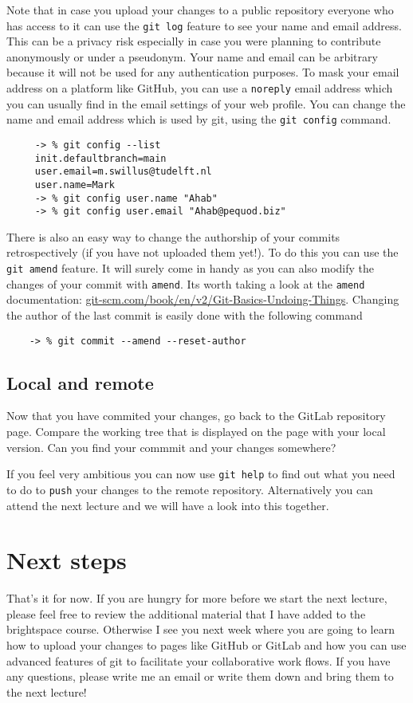 \documentclass[12pt]{article}
\begin{document}
Note that in case you upload your changes to a public repository
everyone who has access to it can use the \texttt{git log} feature to see your name
and email address. This can be a privacy risk especially in case you were
planning to contribute anonymously or under a pseudonym.
Your name and email can be arbitrary because it will not be used
for any authentication purposes.
To mask your email address on a platform like GitHub,
you can use a \texttt{noreply} email address which you can usually find in the email settings
of your web profile.
You can change the name and email address which is used by git,
using the \texttt{git config} command.

    \begin{verbatim}
     -> % git config --list
     init.defaultbranch=main
     user.email=m.swillus@tudelft.nl
     user.name=Mark
     -> % git config user.name "Ahab"
     -> % git config user.email "Ahab@pequod.biz"
    \end{verbatim}

There is also an easy way to change the authorship of your commits
retrospectively (if you have not uploaded them yet!).
To do this you can use the \texttt{git amend} feature.
It will surely come in handy as you can also modify the changes of your commit
with \texttt{amend}.
Its worth taking a look at the \texttt{amend} documentation:
\href{https://git-scm.com/book/en/v2/Git-Basics-Undoing-Things}{git-scm.com/book/en/v2/Git-Basics-Undoing-Things}.
Changing the author of the last commit is easily done with the following command

    \begin{verbatim}
    -> % git commit --amend --reset-author
    \end{verbatim}


\subsection{Local and remote}
Now that you have commited your changes,
go back to the GitLab repository page.
Compare the working tree that is displayed on the page with your local version.
Can you find your commmit and your changes somewhere?

If you feel very ambitious you can now use \texttt{git help} to find out
what you need to do to \texttt{push} your changes to the remote repository.
Alternatively you can attend the next lecture and we will have a look into this together.

\section{Next steps}
That's it for now. If you are hungry for more before we start the next lecture, please
feel free to review the additional material that I have added to the brightspace course.
Otherwise I see you next week where you are going to learn how to upload your changes
to pages like GitHub or GitLab and how you can use advanced features of git to facilitate your
collaborative work flows. If you have any questions,
please write me an email or write them down and bring them to the next lecture!
\end{document}
